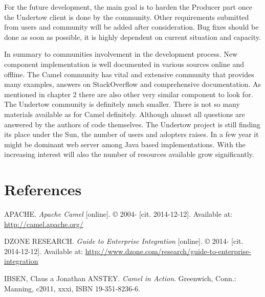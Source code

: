\documentclass[12pt,final,oneside]{fithesis2}
\begin{document}
For the future development, the main goal is to harden the Producer part once the Undertow client is done by the community. Other requirements submitted from users and community will be added after consideration. Bug fixes should be done as soon as possible, it is highly dependent on current situation and capacity.

In summary to communities involvement in the development process. New component implementation is well documented in various sources online and offline. The Camel community has vital and extensive community that provides many examples, answers on StackOverflow and comprehensive documentation. As mentioned in chapter 2 there are also other very similar component to look for. The Undertow community is definitely much smaller. There is not so many materials available as for Camel definitely. Although almost all questions are answered by the authors of code themselves. The Undertow project is still finding its place under the Sun, the number of users and adopters raises. In a few year it might be dominant web server among Java based implementations. With the increasing interest will also the number of resources available grow significantly. 



  



\begingroup
\def\tmpchapter{0}
\renewcommand{\chaptername}{}
\renewcommand{\thechapter}{}
\chapter{References}
\renewcommand{\chapter}[2]{}%




\begin{thebibliography}{}
	 APACHE. \textit{Apache Camel} [online]. \copyright{} 2004- [cit. 2014-12-12]. Available at: \url{http://camel.apache.org/}
	
		 DZONE RESEARCH. \textit{Guide to Enterprise Integration} [online]. \copyright{} 2014- [cit. 2014-12-12]. Available at: \url{http://www.dzone.com/research/guide-to-enterprise-integration}
	
	 IBSEN, Claus a Jonathan ANSTEY. \textit{Camel in Action}. Greenwich, Conn.: Manning, c2011, xxxi, ISBN 19-351-8236-6.
	
\end{thebibliography}

\endgroup
\appendix

\end{document}
